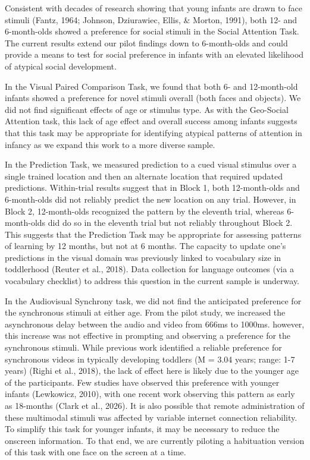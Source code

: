 \documentclass[
  english,
  man,floatsintext]{apa6}
\begin{document}
Consistent with decades of research showing that young infants are drawn to face stimuli (Fantz, 1964; Johnson, Dziurawiec, Ellis, \& Morton, 1991), both 12- and 6-month-olds showed a preference for social stimuli in the Social Attention Task.
The current results extend our pilot findings down to 6-month-olds and could provide a means to test for social preference in infants with an elevated likelihood of atypical social development.

In the Visual Paired Comparison Task, we found that both 6- and 12-month-old infants showed a preference for novel stimuli overall (both faces and objects).
We did not find significant effects of age or stimulus type.
As with the Geo-Social Attention task, this lack of age effect and overall success among infants suggests that this task may be appropriate for identifying atypical patterns of attention in infancy as we expand this work to a more diverse sample.

In the Prediction Task, we measured prediction to a cued visual stimulus over a single trained location and then an alternate location that required updated predictions.
Within-trial results suggest that in Block 1, both 12-month-olds and 6-month-olds did not reliably predict the new location on any trial.
However, in Block 2, 12-month-olds recognized the pattern by the eleventh trial, whereas 6-month-olds did do so in the eleventh trial but not reliably throughout Block 2.
This suggests that the Prediction Task may be appropriate for assessing patterns of learning by 12 months, but not at 6 months.
The capacity to update one's predictions in the visual domain was previously linked to vocabulary size in toddlerhood (Reuter et al., 2018).
Data collection for language outcomes (via a vocabulary checklist) to address this question in the current sample is underway.

In the Audiovisual Synchrony task, we did not find the anticipated preference for the synchronous stimuli at either age.
From the pilot study, we increased the asynchronous delay between the audio and video from 666ms to 1000ms.
however, this increase was not effective in prompting and observing a preference for the synchronous stimuli.
While previous work identified a reliable preference for synchronous videos in typically developing toddlers (M = 3.04 years; range: 1-7 years) (Righi et al., 2018), the lack of effect here is likely due to the younger age of the participants.
Few studies have observed this preference with younger infants (Lewkowicz, 2010), with one recent work observing this pattern as early as 18-months (Clark et al., 2026).
It is also possible that remote administration of these multimodal stimuli was affected by variable internet connection reliability.
To simplify this task for younger infants, it may be necessary to reduce the onscreen information.
To that end, we are currently piloting a habituation version of this task with one face on the screen at a time.
\end{document}
